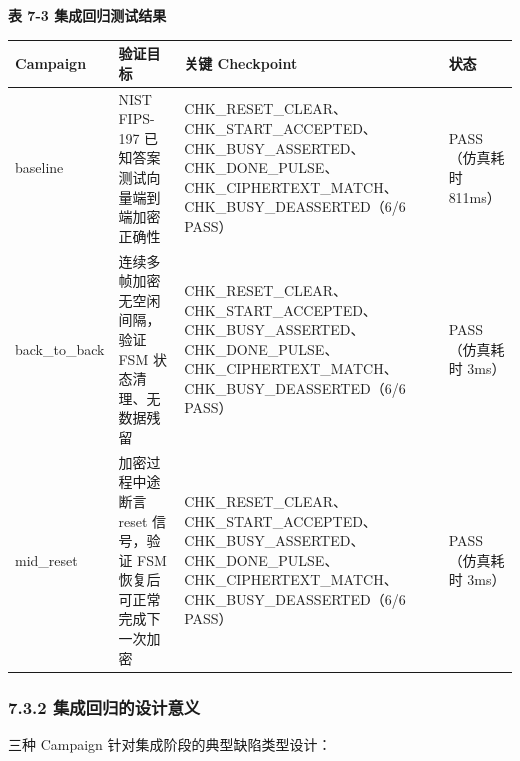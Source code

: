 \textbf{表 7-3 集成回归测试结果}

{\def\LTcaptype{none} %
\begin{longtable}[]{@{}
  >{\raggedright\arraybackslash}p{}
  >{\raggedright\arraybackslash}p{}
  >{\raggedright\arraybackslash}p{}
  >{\raggedright\arraybackslash}p{}@{}}
\toprule\noalign{}
\begin{minipage}[b]{\linewidth}\raggedright
Campaign
\end{minipage} & \begin{minipage}[b]{\linewidth}\raggedright
验证目标
\end{minipage} & \begin{minipage}[b]{\linewidth}\raggedright
关键 Checkpoint
\end{minipage} & \begin{minipage}[b]{\linewidth}\raggedright
状态
\end{minipage} \\
\midrule\noalign{}
\endhead
\bottomrule\noalign{}
\endlastfoot
baseline & NIST FIPS-197 已知答案测试向量端到端加密正确性 &
CHK\_RESET\_CLEAR、CHK\_START\_ACCEPTED、CHK\_BUSY\_ASSERTED、CHK\_DONE\_PULSE、CHK\_CIPHERTEXT\_MATCH、CHK\_BUSY\_DEASSERTED（6/6
PASS） & PASS（仿真耗时 811ms） \\
back\_to\_back & 连续多帧加密无空闲间隔，验证 FSM 状态清理、无数据残留 &
CHK\_RESET\_CLEAR、CHK\_START\_ACCEPTED、CHK\_BUSY\_ASSERTED、CHK\_DONE\_PULSE、CHK\_CIPHERTEXT\_MATCH、CHK\_BUSY\_DEASSERTED（6/6
PASS） & PASS（仿真耗时 3ms） \\
mid\_reset & 加密过程中途断言 reset 信号，验证 FSM
恢复后可正常完成下一次加密 &
CHK\_RESET\_CLEAR、CHK\_START\_ACCEPTED、CHK\_BUSY\_ASSERTED、CHK\_DONE\_PULSE、CHK\_CIPHERTEXT\_MATCH、CHK\_BUSY\_DEASSERTED（6/6
PASS） & PASS（仿真耗时 3ms） \\
\end{longtable}
}

\subsubsection{7.3.2
集成回归的设计意义}\label{ux96c6ux6210ux56deux5f52ux7684ux8bbeux8ba1ux610fux4e49}

三种 Campaign 针对集成阶段的典型缺陷类型设计：

